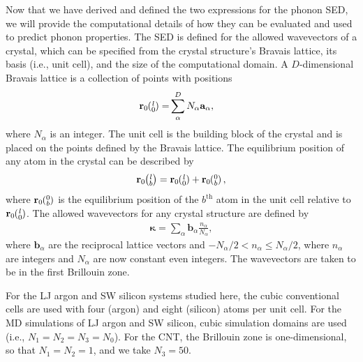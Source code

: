 \documentclass[aps,prb,preprint,superscriptaddress,amsmath,amssymb,floatfix]{revtex4}
\newcommand{\ab}[2]{\mspace{-4.0mu}\left(\mspace{-8.0mu}\begin{smallmatrix}&\ifthenelse{\equal{#1}{}}{a}{#1} \\&\ifthenelse{\equal{#2}{}}{b}{#2}\end{smallmatrix}\mspace{-3.0mu}\right)}
\begin{document}
Now that we have derived and defined the two expressions for the phonon SED, we will provide the computational details of how they can be evaluated and used to predict phonon properties. The SED is defined for the allowed wavevectors of a crystal, which can be specified from the crystal structure's Bravais lattice, its basis (i.e., unit cell), and the size of the computational domain. A $D$-dimensional Bravais lattice is a collection of points with
positions
\begin{equation}\label{crys_pos}
\begin{split}
\mathbf{r}_0\ab{l}{0} =& \sum^D_{\alpha} N_{\alpha}\mathbf{a}_{\alpha},
\end{split}
\end{equation}
where $N_{\alpha}$ is an integer.\cite{dove1993} The unit cell is the building block of the crystal and is placed on the points defined by the Bravais lattice. The equilibrium position of any atom in the crystal can be described by
\begin{equation}\label{crys_pos2}
\begin{split}
\mathbf{r}_0\ab{l}{b} = \mathbf{r}_0\ab{l}{0} + \mathbf{r}_0\ab{0}{b},
\end{split}
\end{equation}
where $\mathbf{r}_0\ab{0}{b}$ is the equilibrium position of the $b^{\textrm{th}}$ atom in the unit cell relative to $\mathbf{r}_0\ab{l}{0}$. The allowed wavevectors for any crystal structure are defined by
\begin{equation}\label{crys_pos3}
\begin{split}
\pmb{\kappa} = \sum_{\alpha} \mathbf{b}_{\alpha} \frac{n_{\alpha}}{N_{\alpha}},
\end{split}
\end{equation}
where $\mathbf{b}_{\alpha}$ are the reciprocal lattice vectors and $-N_{\alpha}/2 < n_{\alpha} \leq N_{\alpha}/2$, where $n_{\alpha}$ are integers and $N_{\alpha}$ are now constant even integers. The wavevectors are taken to be in the first Brillouin zone.\cite{ashcroft1976}

For the LJ argon and SW silicon systems studied here, the cubic conventional cells are used with four (argon) and eight (silicon) atoms per unit cell. For the MD simulations of LJ argon and SW silicon, cubic simulation domains are used (i.e., $N_1 = N_2 = N_3 = N_0$).\cite{mcgaughey2004a,turney2009a} For the CNT, the Brillouin zone is one-dimensional, so that $N_1 = N_2 = 1$, and we take $N_3=50$.\cite{thomas2010c}
\end{document}
